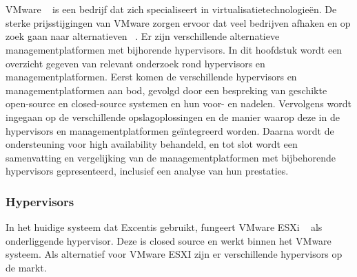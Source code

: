 
\chapter{}%
\label{ch:stand-van-zaken}


VMware ~\autocite{vmware} is een bedrijf dat zich specialiseert in virtualisatietechnologieën. De sterke prijsstijgingen van VMware zorgen ervoor dat veel bedrijven afhaken en op zoek gaan naar alternatieven ~\autocite{Hale2024}.
Er zijn verschillende alternatieve managementplatformen met bijhorende hypervisors.
In dit hoofdstuk wordt een overzicht gegeven van relevant onderzoek rond hypervisors en managementplatformen.
Eerst komen de verschillende hypervisors en managementplatformen aan bod, gevolgd door een bespreking van geschikte open-source en closed-source systemen en hun voor- en nadelen.
Vervolgens wordt ingegaan op de verschillende opslagoplossingen en de manier waarop deze in de hypervisors en managementplatformen geïntegreerd worden.
Daarna wordt de ondersteuning voor high availability behandeld, en tot slot wordt een samenvatting en vergelijking van de managementplatformen met bijbehorende hypervisors gepresenteerd, inclusief een analyse van hun prestaties.
\subsection{Hypervisors}\label{subsec:Hypervisors}
In het huidige systeem dat Excentis gebruikt, fungeert VMware ESXi ~\autocite{vmware} als onderliggende hypervisor. Deze is closed source en werkt binnen het VMware systeem. Als alternatief voor VMware ESXI zijn er verschillende hypervisors op de markt.

